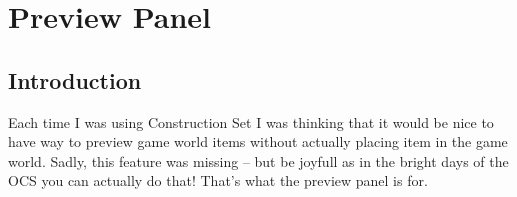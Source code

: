 \section{Preview Panel}

\subsection{Introduction}
Each time I was using Construction Set I was thinking that it would be nice to have way to preview game world items without actually placing item in the game world. Sadly, this feature was missing -- but be joyfull as in the bright days of the OCS{} you can actually do that! That's what the preview panel is for.

